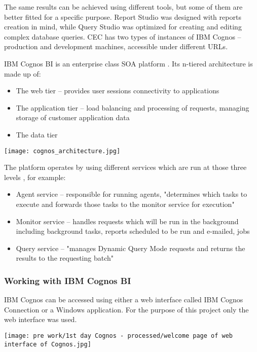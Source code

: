 The same results can be achieved using different tools, but some of them are better fitted for a specific purpose. Report Studio was designed with reports creation in mind, while Query Studio was optimized for creating and editing complex database queries. CEC has two types of instances of IBM Cognos – production and development machines, accessible under different URLs.

IBM Cognos BI is an enterprise class SOA platform \citep{browne2010ibm}. Its n-tiered architecture is made up of:
\begin{itemize}
\item The web tier – provides user sessions connectivity to applications
\item The application tier – load balancing and processing of requests, managing storage of customer application data
\item The data tier
\end{itemize}


\begin{center}
  \texttt{[image: cognos\_architecture.jpg]}
  \label{normal_case}
\end{center}


The platform operates by using different services which are run at those three levels \citep{Browne2010}, for example:
\begin{itemize}
\item Agent service – responsible for running agents, "determines which tasks to execute and forwards those tasks to the monitor service for execution"
\item Monitor service – handles requests which will be run in the background including background tasks, reports scheduled to be run and e-mailed, jobs
\item Query service – "manages Dynamic Query Mode requests and returns the results to the requesting batch"
\end{itemize}
		
			
			\subsubsection{Working with IBM Cognos BI}
			
IBM Cognos can be accessed using either a web interface called IBM Cognos Connection or a Windows application. For the purpose of this project only the web interface was used.

\begin{center}
  \texttt{[image: pre work/1st day Cognos - processed/welcome page of web interface of Cognos.jpg]}
  \label{normal_case}
\end{center}


